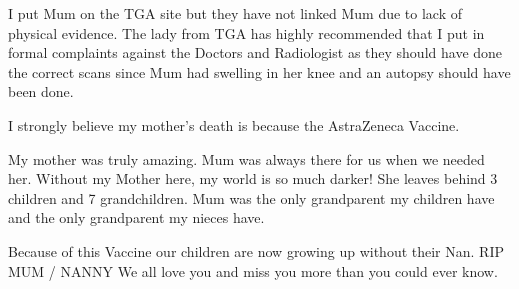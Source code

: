 I put Mum on the TGA site but they have not linked Mum due to lack of physical
evidence. The lady from TGA has highly recommended that I put in formal
complaints against the Doctors and Radiologist as they should have done the
correct scans since Mum had swelling in her knee and an autopsy should have been
done.

I strongly believe my mother’s death is because the AstraZeneca Vaccine.

My mother was truly amazing. Mum was always there for us when we needed
her. Without my Mother here, my world is so much darker! She leaves behind 3
children and 7 grandchildren. Mum was the only grandparent my children have and
the only grandparent my nieces have.

Because of this Vaccine our children are now growing up without their Nan. RIP
MUM / NANNY We all love you and miss you more than you could ever know.


